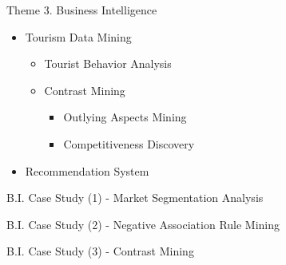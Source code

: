 \documentclass[
 size=14pt,
 paper=smartboard,  %
 mode=present, 		%
 display=slides, 	%
 style=tuliplab,  	%
 pauseslide,
 fleqn,leqno]{powerdot}
\begin{document}

\begin{slide}[toc=,bm=]{Theme 3. Business Intelligence}


\begin{itemize}
\item
Tourism Data Mining

\begin{itemize}
\item
Tourist Behavior Analysis

\item
Contrast Mining

\begin{itemize}

\item
Outlying Aspects Mining

\item
Competitiveness Discovery

\end{itemize}

\end{itemize}

\item
Recommendation System

\end{itemize}

\end{slide}


\begin{slide}[toc=,bm=]{B.I. Case Study (1) - Market Segmentation Analysis}




\end{slide}


\begin{slide}[toc=,bm=]{B.I. Case Study (2) - Negative Association Rule Mining}




\end{slide}


\begin{slide}[toc=,bm=]{B.I. Case Study (3) - Contrast Mining}



\end{slide}
\end{document}
